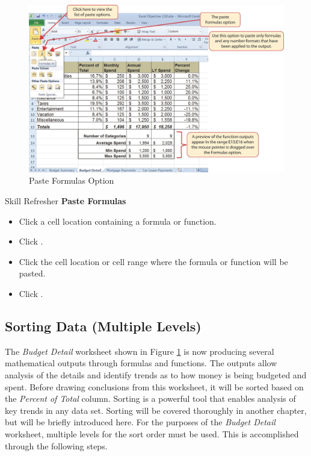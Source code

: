\begin{figure}[H]
	\centering
	\includegraphics[width=\maxwidth{.95\linewidth}]{gfx/ch02_fig26}
	\caption{Paste Formulas Option}
	\label{02:fig26}
\end{figure}

\begin{center}
	\begin{sklbox}{Skill Refresher}
		\textbf{Paste Formulas}
		\\
		\begin{itemize}
			\setlength{\itemsep}{0pt}
			\setlength{\parskip}{0pt}
			\setlength{\parsep}{0pt}
			
			\item Click a cell location containing a formula or function.
			\item Click .
			\item Click the cell location or cell range where the formula or function will be pasted.
			\item Click .
			
		\end{itemize}
	\end{sklbox}
\end{center}

\subsection{Sorting Data (Multiple Levels)}

The \textit{Budget Detail} worksheet shown in Figure \ref{02:fig26} is now producing several mathematical outputs through formulas and functions. The outputs allow analysis of the details and identify trends as to how money is being budgeted and spent. Before drawing conclusions from this worksheet, it will be sorted based on the \textit{Percent of Total} column. Sorting is a powerful tool that enables analysis of key trends in any data set. Sorting will be covered thoroughly in another chapter, but will be briefly introduced here. For the purposes of the \textit{Budget Detail} worksheet, multiple levels for the sort order must be used. This is accomplished through the following steps.

